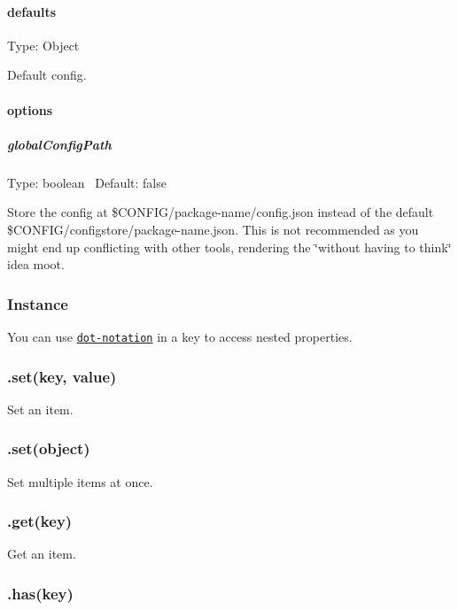 \paragraph*{defaults}

Type\+: {\ttfamily Object}

Default config.

\paragraph*{options}

\subparagraph*{global\+Config\+Path}

Type\+: {\ttfamily boolean}~\newline
 Default\+: {\ttfamily false}

Store the config at {\ttfamily \$\+C\+O\+N\+F\+IG/package-\/name/config.json} instead of the default {\ttfamily \$\+C\+O\+N\+F\+IG/configstore/package-\/name.json}. This is not recommended as you might end up conflicting with other tools, rendering the \char`\"{}without having to think\char`\"{} idea moot.

\subsubsection*{Instance}

You can use \href{https://github.com/sindresorhus/dot-prop}{\tt dot-\/notation} in a {\ttfamily key} to access nested properties.

\subsubsection*{.set(key, value)}

Set an item.

\subsubsection*{.set(object)}

Set multiple items at once.

\subsubsection*{.get(key)}

Get an item.

\subsubsection*{.has(key)}

